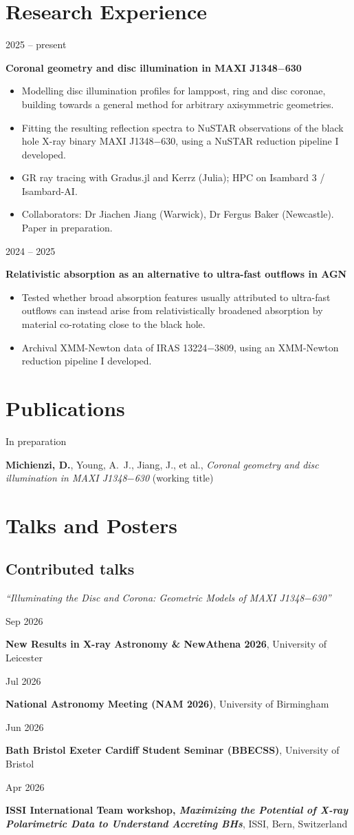\documentclass[10pt,a4paper]{article}
\newcommand{\datewidth}{2.7cm}
\newcommand{\entry}[2]{%
  \par\noindent
  \begin{minipage}[t]{\datewidth}\raggedright\leavevmode\small\color{muted}\strut#1\end{minipage}%
  \hspace{0.4cm}%
  \begin{minipage}[t]{\dimexpr\textwidth-\datewidth-0.4cm\relax}\strut#2\strut\end{minipage}%
  \par\vspace{0.3em}}
\newcommand{\talk}[4]{\entry{#1}{\textbf{#2}, #3\ifblank{#4}{}{\ \textcolor{muted}{(#4)}}}}
\begin{document}
\section{Research Experience}
\entry{2025 -- present}{%
  \textbf{Coronal geometry and disc illumination in MAXI J1348$-$630}
  \begin{itemize}
    \item Modelling disc illumination profiles for lamppost, ring and disc coronae,
          building towards a general method for arbitrary axisymmetric geometries.
    \item Fitting the resulting reflection spectra to NuSTAR observations of the black hole
          X-ray binary MAXI J1348$-$630, using a NuSTAR reduction pipeline I developed.
    \item GR ray tracing with Gradus.jl and Kerrz (Julia); HPC on Isambard 3 / Isambard-AI.
    \item Collaborators: Dr Jiachen Jiang (Warwick), Dr Fergus Baker (Newcastle).
          Paper in preparation.
  \end{itemize}}
 
\entry{2024 -- 2025}{%
  \textbf{Relativistic absorption as an alternative to ultra-fast outflows in AGN}
  \begin{itemize}
    \item Tested whether broad absorption features usually attributed to ultra-fast outflows
          can instead arise from relativistically broadened absorption by material
          co-rotating close to the black hole.
    \item Archival XMM-Newton data of IRAS 13224$-$3809, using an XMM-Newton reduction pipeline I developed.
  \end{itemize}}
 
\section{Publications}
\entry{In preparation}{%
  \textbf{Michienzi, D.}, Young, A.~J., Jiang, J., et al.,
  \emph{Coronal geometry and disc illumination in MAXI J1348$-$630} (working title)}
 
\section{Talks and Posters}
\subsection{Contributed talks}
\emph{``Illuminating the Disc and Corona: Geometric Models of MAXI J1348$-$630''}\par\vspace{0.3em}
\talk{Sep 2026}{New Results in X-ray Astronomy \& NewAthena 2026}{University of Leicester}{}
\talk{Jul 2026}{National Astronomy Meeting (NAM 2026)}{University of Birmingham}{}
\talk{Jun 2026}{Bath Bristol Exeter Cardiff Student Seminar (BBECSS)}{University of Bristol}{}
\talk{Apr 2026}{ISSI International Team workshop, \emph{Maximizing the Potential of X-ray Polarimetric Data to Understand Accreting BHs}}{ISSI, Bern, Switzerland}{}
 
\end{document}

